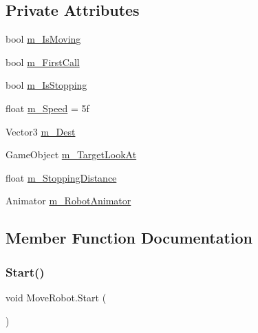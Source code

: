 \subsection*{Private Attributes}
\begin{DoxyCompactItemize}
\item 
bool \mbox{\hyperlink{class_move_robot_a3c7eeca97f62b1b3441b4f94854e6124}{m\+\_\+\+Is\+Moving}}
\item 
bool \mbox{\hyperlink{class_move_robot_a60f1a3b2d56b3c298e677d04d5a7b414}{m\+\_\+\+First\+Call}}
\item 
bool \mbox{\hyperlink{class_move_robot_a348c3db6da2394e433cb3bcd6cd9cb0b}{m\+\_\+\+Is\+Stopping}}
\item 
float \mbox{\hyperlink{class_move_robot_afaca031aa3c9f6a660d71c0e371f536f}{m\+\_\+\+Speed}} = 5f
\item 
Vector3 \mbox{\hyperlink{class_move_robot_a67cd9847aff3dc2e26cbb9cf3f27ab12}{m\+\_\+\+Dest}}
\item 
Game\+Object \mbox{\hyperlink{class_move_robot_a838c7823c5f333bb3583cce57fd9fcc8}{m\+\_\+\+Target\+Look\+At}}
\item 
float \mbox{\hyperlink{class_move_robot_a1be84318f7c7f9f5af8a2e84a2cf76b8}{m\+\_\+\+Stopping\+Distance}}
\item 
Animator \mbox{\hyperlink{class_move_robot_aef5a0d2a14b309e48c645400ec6b9be1}{m\+\_\+\+Robot\+Animator}}
\end{DoxyCompactItemize}


\subsection{Member Function Documentation}
\mbox{\label{class_move_robot_a6f4c86e1a93a5f83cdde0d43998d48bd}} 
\subsubsection{\texorpdfstring{Start()}{Start()}}
{\footnotesize\ttfamily void Move\+Robot.\+Start (\begin{DoxyParamCaption}{ }\end{DoxyParamCaption})\hspace{0.3cm}{\ttfamily [private]}}

\mbox{\label{class_move_robot_acaa18eb45c2af4e040d08314ef6bfd77}} 
